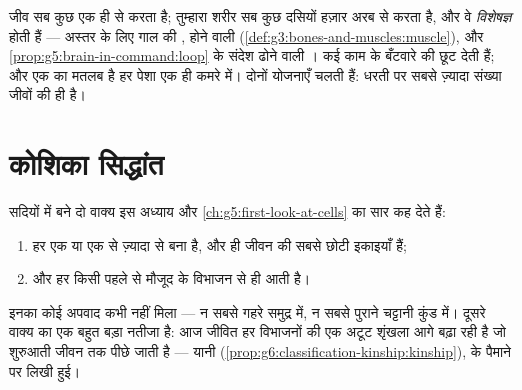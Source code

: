 \begin{remark}[एक कोशिका या कई: जीने के दो ढंग]\label{rem:g6:cell-unit-of-life:twoways}
 जीव सब कुछ एक ही  से करता है; तुम्हारा शरीर सब कुछ
दसियों हज़ार अरब  से करता है, और वे \emph{विशेषज्ञ} होती हैं
--- अस्तर के लिए गाल की ,  होने वाली  
(\cref{def:g3:bones-and-muscles:muscle}), और
\cref{prop:g5:brain-in-command:loop} के संदेश ढोने वाली 
। कई  काम के बँटवारे की छूट देती हैं; और एक  का
मतलब है हर पेशा एक ही कमरे में। दोनों योजनाएँ चलती हैं: धरती पर सबसे
ज़्यादा संख्या  जीवों की ही है।
\end{remark}

\section{कोशिका सिद्धांत}

\begin{proposition}[कोशिका सिद्धांत]\label{prop:g6:cell-unit-of-life:theory}
सदियों में बने दो वाक्य इस अध्याय और
\cref{ch:g5:first-look-at-cells} का सार कह देते हैं:
\begin{enumerate}
  \item हर  एक या एक से ज़्यादा  से बना है, और  ही
        जीवन की सबसे छोटी इकाइयाँ हैं;
  \item और हर  किसी पहले से मौजूद  के विभाजन से ही आती
        है।
\end{enumerate}
इनका कोई अपवाद कभी नहीं मिला --- न सबसे गहरे समुद्र में, न सबसे पुराने
चट्टानी कुंड में। दूसरे वाक्य का एक बहुत बड़ा नतीजा है: आज जीवित हर
 विभाजनों की एक अटूट शृंखला आगे बढ़ा रही है जो शुरुआती जीवन तक
पीछे जाती है --- यानी 
(\cref{prop:g6:classification-kinship:kinship}),  के पैमाने पर
लिखी हुई।
\end{proposition}
\admitted

